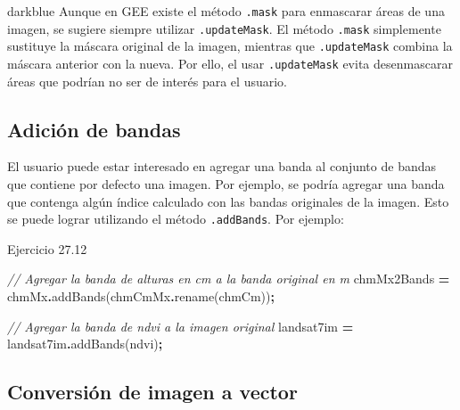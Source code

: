 \documentclass[
  12pt,
  letterpaper,
  twoside]{book}
\newenvironment{Shaded}{\begin{snugshade}}{\end{snugshade}}
\newcommand{\CommentTok}[1]{\textcolor[rgb]{0.56,0.35,0.01}{\textit{#1}}}
\newcommand{\FunctionTok}[1]{\textcolor[rgb]{0.00,0.00,0.00}{#1}}
\newcommand{\NormalTok}[1]{#1}
\newcommand{\OperatorTok}[1]{\textcolor[rgb]{0.81,0.36,0.00}{\textbf{#1}}}
\newcommand{\StringTok}[1]{\textcolor[rgb]{0.31,0.60,0.02}{#1}}
\begin{document}
\begin{bluebox2}

\begin{awesomeblock}{5pt}{\faLightbulb}{darkblue}
Aunque en GEE existe el método \texttt{.mask} para enmascarar áreas de una imagen, se sugiere siempre utilizar \texttt{.updateMask}. El método \texttt{.mask} simplemente sustituye la máscara original de la imagen, mientras que \texttt{.updateMask} combina la máscara anterior con la nueva. Por ello, el usar \texttt{.updateMask} evita desenmascarar áreas que podrían no ser de interés para el usuario.

\end{awesomeblock}

\end{bluebox2}

\hypertarget{adiciuxf3n-de-bandas}{%
\subsection{Adición de bandas}\label{adiciuxf3n-de-bandas}}

El usuario puede estar interesado en agregar una banda al conjunto de bandas que contiene por defecto una imagen. Por ejemplo, se podría agregar una banda que contenga algún índice calculado con las bandas originales de la imagen. Esto se puede lograr utilizando el método \texttt{.addBands}. Por ejemplo:

Ejercicio 27.12

\begin{Shaded}
\begin{Highlighting}[]
\CommentTok{// Agregar la banda de alturas en cm a la banda original en m}
\NormalTok{chmMx2Bands }\OperatorTok{=}\NormalTok{ chmMx}\OperatorTok{.}\FunctionTok{addBands}\NormalTok{(chmCmMx}\OperatorTok{.}\FunctionTok{rename}\NormalTok{(}\StringTok{\textquotesingle{}chmCm\textquotesingle{}}\NormalTok{))}\OperatorTok{;}

\CommentTok{// Agregar la banda de ndvi a la imagen original}
\NormalTok{landsat7im }\OperatorTok{=}\NormalTok{ landsat7im}\OperatorTok{.}\FunctionTok{addBands}\NormalTok{(ndvi)}\OperatorTok{;}
\end{Highlighting}
\end{Shaded}

\hypertarget{conversiuxf3n-de-imagen-a-vector}{%
\subsection{Conversión de imagen a vector}\label{conversiuxf3n-de-imagen-a-vector}}
\end{document}
